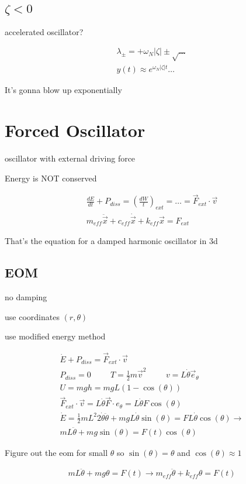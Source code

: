 \documentclass[fleqn]{report}
\newcommand{\hp}{\hspace{1cm}}
\newcommand{\equations} [1] {
\begin{gather*}
#1
\end{gather*}
}
\begin{document}
\subsection{$\zeta < 0$}
accelerated oscillator?

\equations{
    \lambda_\pm = +\omega_N |\zeta| \pm \sqrt{\ldots}
    \\
    y(t) \approx e^{\omega_N |\zeta| t} \ldots 
}
It's gonna blow up exponentially 


\section{Forced Oscillator}
oscillator with external driving force 

Energy is NOT conserved 

\equations{
    \frac{dE}{dt} + P_{diss} = (\frac{dW}{t})_{ext} = 
    \ldots = \vec F_{ext} \cdot \vec v
    \\
    m_{eff} \ddot {\vec x} + c_{eff} \dot {\vec x} + k_{eff} \vec x = F_{ext}
}
That's the equation for a damped harmonic oscillator in 3d 

\subsection{EOM}
no damping 

use coordinates $(r, \theta)$ 

use modified energy method 

\equations{
    \dot E + P_{diss} = \vec F_{ext} \cdot \vec v
    \\
    P_{diss} = 0 \hp T = \frac{1}{2} m \vec v^2 
    \hp 
    v = L \dot \theta \vec e_{\theta} 
    \\
    U = mgh = mgL(1 - \cos(\theta))
    \\
    \vec F_{ext} \cdot \vec v = 
    L \dot \theta \vec F \cdot e_\theta 
    =
    L \dot \theta F \cos(\theta)
    \\
    \dot E = \frac{1}{2} m L^2 2 \dot \theta \ddot \theta + 
    mgL \dot \theta \sin(\theta)
    =
    FL \dot \theta \cos(\theta)
    \rightarrow 
    \\
    mL \ddot \theta + mg\sin(\theta) = F(t) \cos(\theta)
}

Figure out the eom for small $\theta$ so $\sin(\theta) = \theta$ and $\cos(\theta) \approx 1$

\equations{
    mL \ddot \theta + mg\theta = F(t)
    \rightarrow 
    m_{eff} \ddot \theta + k_{eff} \theta = F(t)
}
\end{document}
